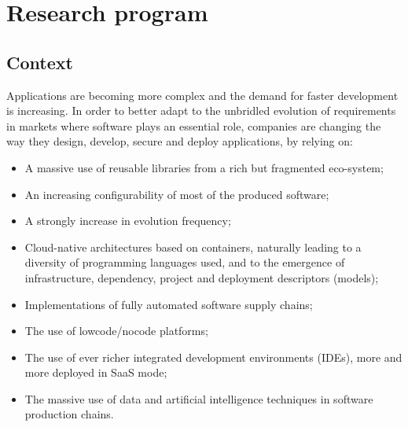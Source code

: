 








\section{Research program}
\label{diverse:research}

\subsection{Context}

Applications are becoming more complex and the demand for faster development is increasing. In order to better adapt to the unbridled evolution of requirements in markets where software plays an essential role, companies are changing the way they design, develop, secure and deploy applications, by relying on:

\begin{itemize}
	\item A massive use of reusable libraries from a rich but fragmented eco-system;
	\item An increasing configurability of most of the produced software; 
	\item  A strongly increase in evolution frequency;
	\item Cloud-native architectures based on containers, naturally leading to a diversity of programming  languages used, and to the emergence of infrastructure, dependency, project and deployment descriptors (models); 
\item Implementations of fully automated software supply chains; 	
\item  The use of lowcode/nocode platforms;
\item The use of ever richer integrated development environments (IDEs),  more and more deployed in SaaS mode; 
\item The massive use of data and artificial intelligence techniques in software production chains.
\end{itemize}

